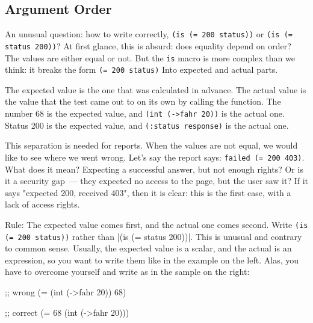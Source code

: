 \subsection{Argument Order}


An unusual question: how to write correctly, \verb|(is (= 200 status))| or \verb|(is (= status 200))|? At first glance, this is absurd: does equality depend on order? The values are either equal or not. But the \verb|is| macro is more complex than we think: it breaks the form \verb|(= 200 status)| Into expected and actual parts.

\mnoindent
The expected value is the one that was calculated in advance. The actual value is the value that the test came out to on its own by calling the function. The number 68 is the expected value, and \verb|(int (->fahr 20))| is the actual one. Status 200 is the expected value, and \verb|(:status response)| is the actual one.

This separation is needed for reports. When the values are not equal, we would like to see where we went wrong. Let's say the report says: \verb|failed (= 200 403)|. What does it mean? Expecting a successful answer, but not enough rights? Or is it a security gap~--- they expected no access to the page, but the user saw it? If it says "expected 200, received 403", then it is clear: this is the first case, with a lack of access rights.

Rule: The expected value comes first, and the actual one comes second. Write \verb|(is (= 200 status))| rather than \spverb|(is (= status 200))|.
This is unusual and contrary to common sense. Usually, the expected value is a scalar, and the actual is an expression, so you want to write them like in the example on the left. Alas, you have to overcome yourself and write as in the sample on the right:

\ifx\DEVICETYPE\MOBILE

\begin{english}
  \begin{clojure}
;; wrong
(= (int (->fahr 20)) 68)
  \end{clojure}

\splitter

  \begin{clojure}
;; correct
(= 68 (int (->fahr 20)))
  \end{clojure}
\end{english}

\else

